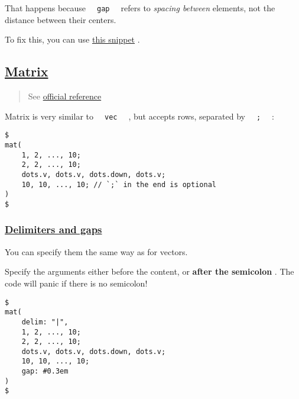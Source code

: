 \pandocbounded{}

That happens because \texttt{\ }{\texttt{\ gap\ }}\texttt{\ } refers to
\emph{spacing between} elements, not the distance between their centers.

To fix this, you can use \href{../../snippets/math/vecs.html}{this
snippet} .

\subsection{\texorpdfstring{\hyperref[matrix]{Matrix}}{Matrix}}\label{matrix}

\begin{quote}
See \href{https://typst.app/docs/reference/math/mat/}{official
reference}
\end{quote}

Matrix is very similar to \texttt{\ }{\texttt{\ vec\ }}\texttt{\ } , but
accepts rows, separated by \texttt{\ }{\texttt{\ ;\ }}\texttt{\ } :

\begin{verbatim}
$
mat(
    1, 2, ..., 10;
    2, 2, ..., 10;
    dots.v, dots.v, dots.down, dots.v;
    10, 10, ..., 10; // `;` in the end is optional
)
$
\end{verbatim}

\pandocbounded{}

\subsubsection{\texorpdfstring{\hyperref[delimiters-and-gaps]{Delimiters
and gaps}}{Delimiters and gaps}}\label{delimiters-and-gaps}

You can specify them the same way as for vectors.

Specify the arguments either before the content, or \textbf{after the
semicolon} . The code will panic if there is no semicolon!

\begin{verbatim}
$
mat(
    delim: "|",
    1, 2, ..., 10;
    2, 2, ..., 10;
    dots.v, dots.v, dots.down, dots.v;
    10, 10, ..., 10;
    gap: #0.3em
)
$
\end{verbatim}

\pandocbounded{}

